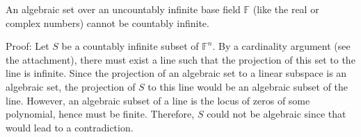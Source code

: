 \documentclass[12pt]{article}
\begin{document}
An algebraic set over an uncountably infinite base field $\mathbb{F}$ (like the real or complex numbers) cannot be countably infinite.

Proof:  Let $S$ be a countably infinite subset of $\mathbb{F}^n$.  By a cardinality argument (see the attachment), there must exist a line such that the projection of this set  to the line is infinite.  Since the projection of an algebraic set to a  linear subspace is an algebraic set, the projection of $S$ to this line would be an algebraic subset of the line.  However, an algebraic subset of a line is the locus of zeros of some polynomial, hence must be finite.  Therefore, $S$ could not be algebraic since that would lead to a contradiction.
\end{document}
